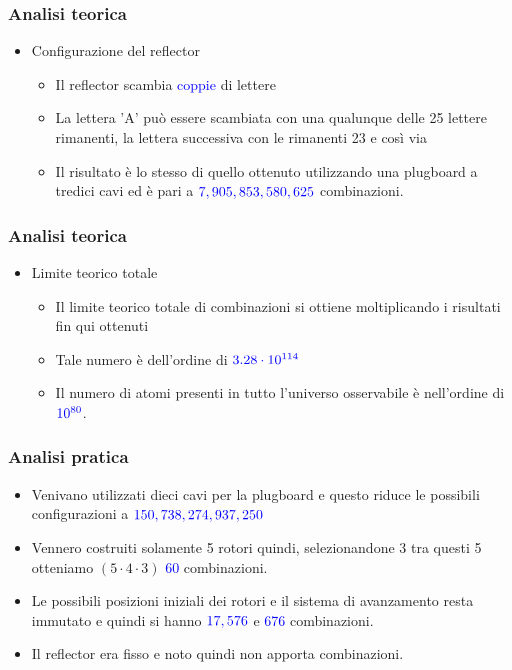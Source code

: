 	\begin{frame}
		\frametitle{Analisi teorica}
		\begin{itemize}
			\item Configurazione del reflector
			\begin{itemize}
				\item Il reflector scambia \textcolor{blue}{coppie} di lettere 
				\item La lettera 'A' può essere scambiata con una qualunque delle 25 lettere rimanenti, la lettera successiva con le rimanenti 23 e così via
				\item Il risultato è lo stesso di quello ottenuto utilizzando una plugboard a tredici cavi ed è pari a $\textcolor{blue}{7,905,853,580,625}$ combinazioni.
			\end{itemize}
		\end{itemize}
	\end{frame}
	
	\begin{frame}
		\frametitle{Analisi teorica}
		\begin{itemize}
			\item Limite teorico totale
			\begin{itemize}
				\item Il limite teorico totale di combinazioni si ottiene moltiplicando i risultati fin qui ottenuti
				\item Tale numero è dell'ordine di $\textcolor{blue}{3.28 \cdot 10^{114}}$
				\item Il numero di atomi presenti in tutto l'universo osservabile è nell'ordine di $\textcolor{blue}{10^{80}}$.
			\end{itemize}
		\end{itemize}
	\end{frame}
	
	\begin{frame}
		\frametitle{Analisi pratica}
		\begin{itemize}
			\item Venivano utilizzati  dieci cavi per la plugboard e questo riduce le possibili configurazioni a $\textcolor{blue}{150,738,274,937,250}$
			\item Vennero costruiti solamente 5 rotori quindi, selezionandone 3 tra questi 5 otteniamo $(5 \cdot 4 \cdot 3)$ \textcolor{blue}{60} combinazioni.
			\item Le possibili posizioni iniziali dei rotori e il sistema di avanzamento resta immutato e quindi si hanno $\textcolor{blue}{17,576}$ e \textcolor{blue}{676} combinazioni.
			\item Il reflector era fisso e noto quindi non apporta combinazioni.
		\end{itemize}
	\end{frame}
	
